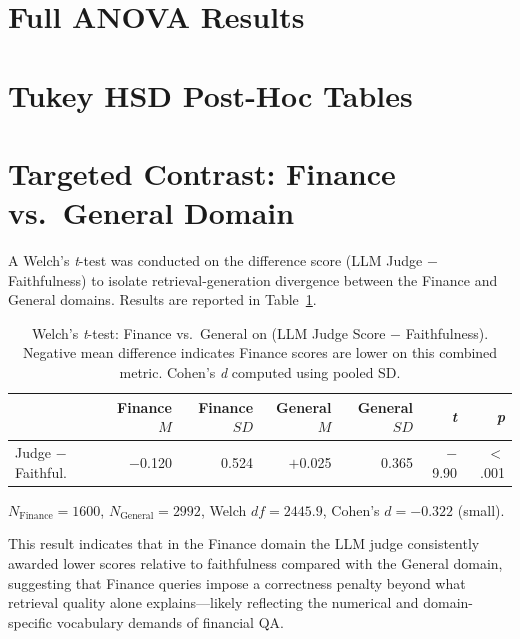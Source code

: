 \section{Full ANOVA Results}
\label{app:anova}



\section{Tukey HSD Post-Hoc Tables}
\label{app:tukey}







\section{Targeted Contrast: Finance vs.\ General Domain}
\label{app:contrast}

A Welch's \textit{t}-test was conducted on the difference score
(LLM Judge $-$ Faithfulness) to isolate retrieval-generation divergence
between the Finance and General domains. Results are reported in
Table~\ref{tab:targeted_contrast}.

\begin{table}[h]
\centering
\caption{Welch's \textit{t}-test: Finance vs.\ General on
  (LLM Judge Score $-$ Faithfulness). Negative mean difference indicates
  Finance scores are lower on this combined metric. Cohen's \textit{d}
  computed using pooled SD.}
\label{tab:targeted_contrast}
\begin{tabular}{lrrrrrr}
\toprule
 & \textbf{Finance} $M$ & \textbf{Finance} $SD$
 & \textbf{General} $M$ & \textbf{General} $SD$
 & \textbf{\textit{t}} & \textbf{\textit{p}} \\
\midrule
Judge $-$ Faithful. & $-$0.120 & 0.524 & $+$0.025 & 0.365 & $-$9.90 & $<$.001 \\
\bottomrule
\end{tabular}

\smallskip
{\small $N_{\text{Finance}} = 1600$, $N_{\text{General}} = 2992$,
Welch $df = 2445.9$, Cohen's $d = -0.322$ (small).}
\end{table}

This result indicates that in the Finance domain the LLM judge consistently
awarded lower scores relative to faithfulness compared with the General domain,
suggesting that Finance queries impose a correctness penalty beyond what
retrieval quality alone explains---likely reflecting the numerical and
domain-specific vocabulary demands of financial QA.


